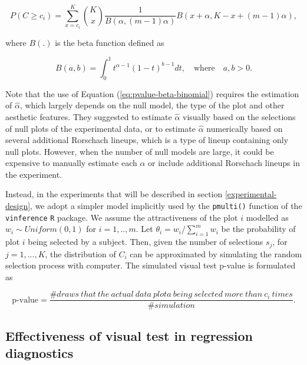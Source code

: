 \documentclass[]{interact}
\theoremstyle{plain}%
\theoremstyle{definition}
\theoremstyle{remark}
\begin{document}
\begin{equation} \label{eq:pvalue-beta-binomial}
P(C \geq c_i) = \sum_{x=c_i}^{K}{{K}\choose{x}}\frac{1}{B(\alpha, (m-1)\alpha)}B(x + \alpha, K - x + (m - 1)\alpha),
\end{equation}

where \(B(.)\) is the beta function defined as

\begin{equation} \label{eq:betafunction}
B(a, b) = \int_{0}^{1}t^{\alpha - 1}(1-t)^{b-1}dt,\quad \text{where}\quad a,b>0. 
\end{equation}

Note that the use of Equation (\ref{eq:pvalue-beta-binomial}) requires
the estimation of \(\hat{\alpha}\), which largely depends on the null
model, the type of the plot and other aesthetic features. They suggested
to estimate \(\hat{\alpha}\) visually based on the selections of null
plots of the experimental data, or to estimate \(\hat{\alpha}\)
numerically based on several additional Rorschach lineups, which is a
type of lineup containing only null plots. However, when the number of
null models are large, it could be expensive to manually estimate each
\(\alpha\) or include additional Rorschach lineups in the experiment.

Instead, in the experiments that will be described in section
\ref{experimental-design}, we adopt a simpler model implicitly used by
the \texttt{pmulti()} function of the \texttt{vinference} \texttt{R}
package. We assume the attractiveness of the plot \(i\) modelled as
\(w_i \sim Uniform(0,1)\) for \(i=1,..,m\). Let
\(\theta_i = w_i/\sum_{i=1}^{m}w_i\) be the probability of plot \(i\)
being selected by a subject. Then, given the number of selections
\(s_j\), for \(j=1,...,K\), the distribution of \(C_i\) can be
approximated by simulating the random selection process with computer.
The simulated visual test p-value is formulated as

\begin{equation} \label{eq:p-value-multi}
\text{p-value} = \frac{\#draws~that~the~actual~data~plota~being~selected~more~than~c_i~times}{\#simulation}.
\end{equation}

\hypertarget{effectiveness-of-visual-test-in-regression-diagnostics}{%
\subsection{Effectiveness of visual test in regression
diagnostics}\label{effectiveness-of-visual-test-in-regression-diagnostics}}
\end{document}

